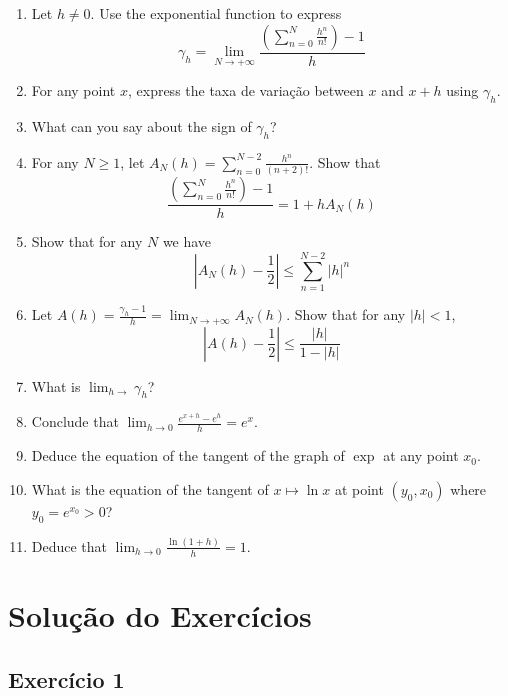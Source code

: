 \begin{enumerate}
\item Let $h \neq 0$.
  Use the exponential function to express
  $$\gamma_h = \lim_{N \rightarrow +\infty}
  \frac{\left(\sum_{n=0}^N \frac{h^n}{n!}\right) - 1}{h}$$
\item For any point $x$, express the taxa de variação between $x$ and $x+h$
  using $\gamma_h$.
\item What can you say about the sign of $\gamma_h$?
\item For any $N \geq 1$, let
  $A_N(h) = \sum_{n=0}^{N-2} \frac{h^{n}}{{(n+2)}!}$. Show that
  $$\frac{\left(\sum_{n=0}^N \frac{h^n}{n!}\right) - 1}{h} = 1 + h A_N(h)$$
\item Show that for any $N$ we have
  $$
  \left|A_N(h)-\frac{1}{2}\right| \leq
  \sum_{n=1}^{N-2} {|h|}^n
  $$
\item Let
  $A(h) = \frac{\gamma_h-1}{h} =
  \lim_{N\rightarrow +\infty} A_N(h)$.
  Show that for any $|h| < 1$,
  $$
  \left|A(h)-\frac{1}{2}\right| \leq \frac{|h|}{1-{|h|}}
  $$
\item What is $\lim_{h \rightarrow} \gamma_h$?
\item Conclude that $\lim_{h \rightarrow 0} \frac{e^{x+h}-e^{h}}{h} = e^x$.
\item Deduce the equation of the
  tangent of the graph of $\exp$ at any point $x_0$.
\item What is the equation of the tangent of $x \mapsto \ln x$
  at point $(y_0, x_0)$ where $y_0=e^{x_0} > 0$?
\item Deduce that
  $\lim_{h \rightarrow 0} \frac{\ln{(1+h)}}{h} = 1$.
\end{enumerate}

\section{Solução do Exercícios}

\subsection*{Exercício 1}

